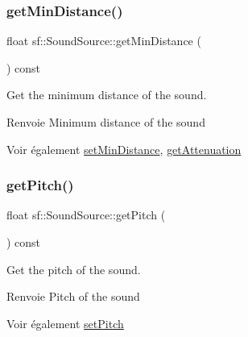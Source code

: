 \subsubsection{\texorpdfstring{get\+Min\+Distance()}{getMinDistance()}}
{\footnotesize\ttfamily float sf\+::\+Sound\+Source\+::get\+Min\+Distance (\begin{DoxyParamCaption}{ }\end{DoxyParamCaption}) const}



Get the minimum distance of the sound. 

\begin{DoxyReturn}{Renvoie}
Minimum distance of the sound
\end{DoxyReturn}
\begin{DoxySeeAlso}{Voir également}
\hyperlink{classsf_1_1SoundSource_a75bbc2c34addc8b25a14edb908508afe}{set\+Min\+Distance}, \hyperlink{classsf_1_1SoundSource_a8ad7dafb4f1b4afbc638cebe24f48cc9}{get\+Attenuation} 
\end{DoxySeeAlso}
\mbox{\label{classsf_1_1SoundSource_a4736acc2c802f927544c9ce52a44a9e4}} 
\subsubsection{\texorpdfstring{get\+Pitch()}{getPitch()}}
{\footnotesize\ttfamily float sf\+::\+Sound\+Source\+::get\+Pitch (\begin{DoxyParamCaption}{ }\end{DoxyParamCaption}) const}



Get the pitch of the sound. 

\begin{DoxyReturn}{Renvoie}
Pitch of the sound
\end{DoxyReturn}
\begin{DoxySeeAlso}{Voir également}
\hyperlink{classsf_1_1SoundSource_a72a13695ed48b7f7b55e7cd4431f4bb6}{set\+Pitch} 
\end{DoxySeeAlso}
\mbox{\label{classsf_1_1SoundSource_a8d199521f55550c7a3b2b0f6950dffa1}} 
